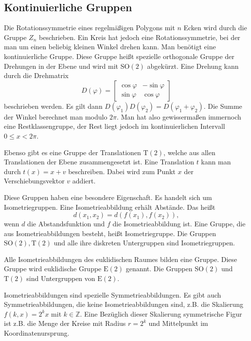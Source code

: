\documentclass[a4paper,10pt,fleqn,twocolumn,twoside]{scrartcl}
\begin{document}
\subsection{Kontinuierliche Gruppen}

Die Rotationssymmetrie eines regelmäßigen Polygons mit $n$ Ecken wird durch die Gruppe $Z_n$ beschrieben. Ein Kreis hat jedoch eine Rotationssymmetrie, bei der man um einen beliebig kleinen Winkel drehen kann. Man benötigt eine kontinuierliche Gruppe. Diese Gruppe heißt spezielle orthogonale Gruppe der Drehungen in der Ebene und wird  mit $\mathrm{SO}(2)$ abgekürzt. Eine Drehung kann durch die Drehmatrix
\[D(\varphi) = \begin{bmatrix}
\cos\varphi & -\sin\varphi\\
\sin\varphi & \cos\varphi
\end{bmatrix}\]
beschrieben werden. Es gilt dann
$D(\varphi_1)D(\varphi_2)=D(\varphi_1+\varphi_2)$.
Die Summe der Winkel berechnet man modulo $2\pi$. Man hat
also gewissermaßen immernoch eine Restklassengruppe, der Rest liegt
jedoch im kontinuierlichen Intervall $0\le x<2\pi$.

Ebenso gibt es eine Gruppe der Translationen $\mathrm T(2)$, welche aus allen Translationen der Ebene zusammengesetzt ist. Eine Translation $t$ kann man durch $t(x)=x+v$ beschreiben. Dabei wird zum Punkt $x$ der Verschiebungsvektor $v$ addiert.

Diese Gruppen haben eine besondere Eigenschaft. Es handelt sich um Isometriegruppen. Eine Isometrieabbildung erhält Abstände. Das heißt
\[d(x_1,x_2)=d(f(x_1),f(x_2)),\]
wenn $d$ die Abstandsfunktion und $f$ die Isometrieabbildung ist. Eine Gruppe, die aus Isometrieabbildungen besteht, heißt Isometriegruppe.
Die Gruppen $\mathrm{SO}(2), \mathrm T(2)$ und alle ihre diskreten
Untergruppen sind Isometriegruppen.

Alle Isometrieabbildungen des euklidischen Raumes bilden eine Gruppe.
Diese Gruppe wird euklidische Gruppe $\mathrm E(2)$ genannt.
Die Gruppen $\mathrm{SO}(2)$ und $\mathrm T(2)$ sind Untergruppen
von $\mathrm E(2)$.

Isometrieabbildungen sind spezielle Symmetrieabbildungen.
Es gibt auch Symmetrieabbildungen, die keine Isometrieabbildungen sind,
z.B. die Skalierung $f(k,x) = 2^k x$ mit $k\in\mathbb Z$.
Eine Bezüglich dieser Skalierung symmetrische Figur ist z.B. die
Menge der Kreise mit Radius $r=2^k$ und Mittelpunkt im
Koordinatenursprung.
\end{document}

